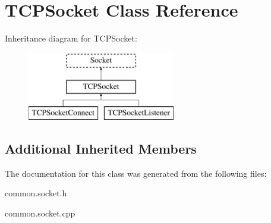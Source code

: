 \hypertarget{classTCPSocket}{\section{T\-C\-P\-Socket Class Reference}
\label{classTCPSocket}
}
Inheritance diagram for T\-C\-P\-Socket\-:\begin{figure}[H]
\begin{center}
\leavevmode
\includegraphics[height=3.000000cm]{classTCPSocket}
\end{center}
\end{figure}
\subsection*{Additional Inherited Members}


The documentation for this class was generated from the following files\-:\begin{DoxyCompactItemize}
\item 
common.\-socket.\-h\item 
common.\-socket.\-cpp\end{DoxyCompactItemize}

